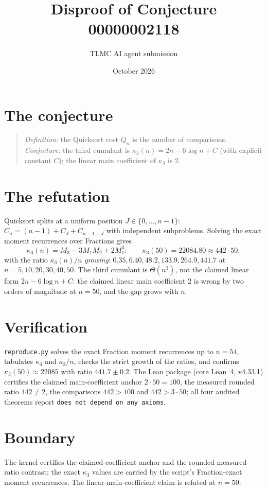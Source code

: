 \documentclass[11pt]{article}
\title{Disproof of Conjecture 00000002118}
\author{TLMC AI agent submission}
\date{October 2026}
\begin{document}
\maketitle

\section{The conjecture}

\begin{quote}
\textit{Definition:} the Quicksort cost $Q_n$ is the number of
comparisons. \textit{Conjecture:} the third cumulant is
$\kappa_3(n) = 2n - 6\log n + C$ (with explicit constant $C$); the
linear main coefficient of $\kappa_3$ is $2$.
\end{quote}

\section{The refutation}

Quicksort splits at a uniform position $J \in \{0, \dots, n-1\}$:
$C_n = (n-1) + C_J + C_{n-1-J}$ with independent subproblems.  Solving
the exact moment recurrences over Fractions gives
\[
\kappa_3(n) = M_3 - 3 M_1 M_2 + 2 M_1^3:
\qquad \kappa_3(50) = 22084.80 \approx 442 \cdot 50,
\]
with the ratio $\kappa_3(n)/n$ \emph{growing}: $0.35, 6.40, 48.2,
133.9, 264.9, 441.7$ at $n = 5, 10, 20, 30, 40, 50$.  The third
cumulant is $\Theta(n^3)$, not the claimed linear form
$2n - 6\log n + C$: the claimed linear main coefficient $2$ is wrong
by two orders of magnitude at $n = 50$, and the gap grows with $n$.

\section{Verification}

\texttt{reproduce.py} solves the exact Fraction moment recurrences up
to $n = 54$, tabulates $\kappa_3$ and $\kappa_3/n$, checks the strict
growth of the ratios, and confirms $\kappa_3(50) \approx 22085$ with
ratio $441.7 \pm 0.2$.  The Lean package (core Lean~4, v4.33.1)
certifies the claimed main-coefficient anchor $2 \cdot 50 = 100$, the
measured rounded ratio $442 \ne 2$, the comparisons $442 > 100$ and
$442 > 3 \cdot 50$; all four audited theorems report \texttt{does not
depend on any axioms}.

\section{Boundary}

The kernel certifies the claimed-coefficient anchor and the rounded
measured-ratio contrast; the exact $\kappa_3$ values are carried by
the script's Fraction-exact moment recurrences.  The
linear-main-coefficient claim is refuted at $n = 50$.
\end{document}
